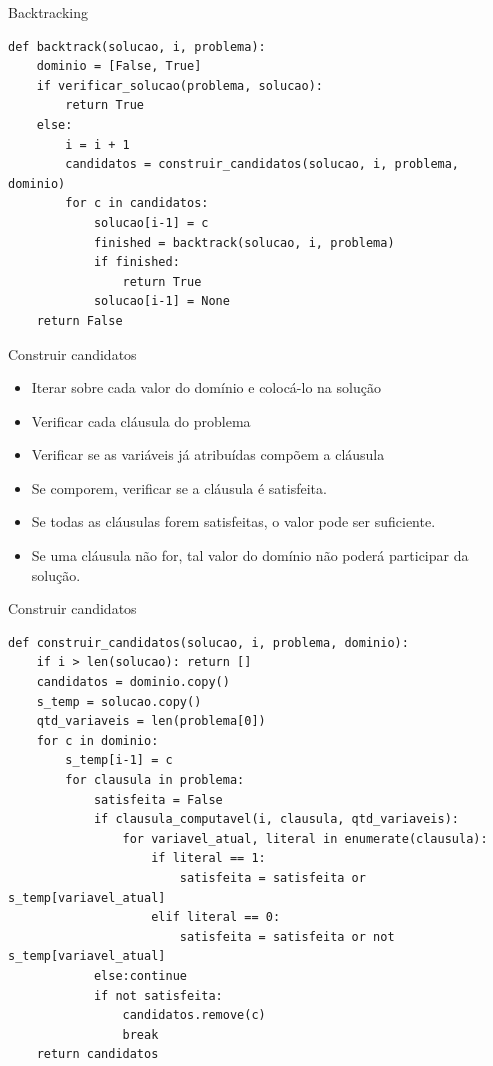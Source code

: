 \documentclass[compress,aspectratio=169]{beamer}
\begin{document}
    \begin{frame}[fragile]{Backtracking}
        \begin{lstlisting}
def backtrack(solucao, i, problema):
    dominio = [False, True]
    if verificar_solucao(problema, solucao):
        return True
    else:
        i = i + 1
        candidatos = construir_candidatos(solucao, i, problema, dominio)
        for c in candidatos:
            solucao[i-1] = c
            finished = backtrack(solucao, i, problema)
            if finished:
                return True
            solucao[i-1] = None
    return False
        \end{lstlisting}
    \end{frame}

    \begin{frame}{Construir candidatos}
        \begin{itemize}
            \item Iterar sobre cada valor do domínio e colocá-lo na solução
            \item Verificar cada cláusula do problema
            \item Verificar se as variáveis já atribuídas compõem a cláusula
            \item Se comporem, verificar se a cláusula é satisfeita. 
            \item Se todas as cláusulas forem satisfeitas, o valor pode ser suficiente.
            \item Se uma cláusula não for, tal valor do domínio não poderá participar da solução.
        \end{itemize}
    \end{frame}

    \begin{frame}[fragile]{Construir candidatos}
        \begin{lstlisting}
def construir_candidatos(solucao, i, problema, dominio):
    if i > len(solucao): return []
    candidatos = dominio.copy()
    s_temp = solucao.copy()
    qtd_variaveis = len(problema[0])
    for c in dominio:
        s_temp[i-1] = c
        for clausula in problema:
            satisfeita = False  
            if clausula_computavel(i, clausula, qtd_variaveis):
                for variavel_atual, literal in enumerate(clausula):
                    if literal == 1:
                        satisfeita = satisfeita or s_temp[variavel_atual]
                    elif literal == 0:
                        satisfeita = satisfeita or not s_temp[variavel_atual]
            else:continue
            if not satisfeita:
                candidatos.remove(c)
                break
    return candidatos
        \end{lstlisting}
    \end{frame}
\end{document}
